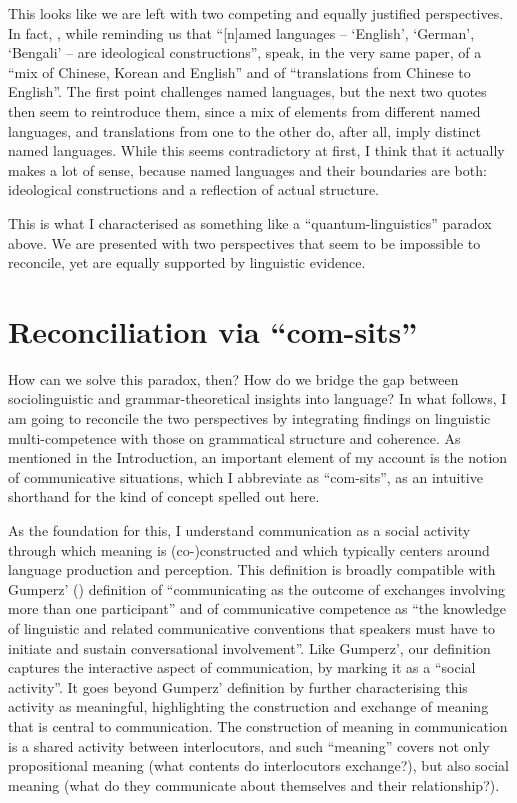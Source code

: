 This looks like we are left with two competing and equally justified perspectives. In fact, \citet{BlommaertRampton2011}, while reminding us that “[n]amed languages – ‘English’, ‘German’, ‘Bengali’ – are ideological constructions”, speak, in the very same paper, of a “mix of Chinese, Korean and English” and of “translations from Chinese to English”. The first point challenges named languages, but the next two quotes then seem to reintroduce them, since a mix of elements from different named languages, and translations from one to the other do, after all, imply distinct named languages. While this seems contradictory at first, I think that it actually makes a lot of sense, because named languages and their boundaries are both: ideological constructions and a reflection of actual structure.

This is what I characterised as something like a “quantum-linguistics” paradox above. We are presented with two perspectives that seem to be impossible to reconcile, yet are equally supported by linguistic evidence.

\section{Reconciliation via “com-sits”}
\label{sec:1.2}
How can we solve this paradox, then? How do we bridge the gap between sociolinguistic and grammar-theoretical insights into language? In what follows, I am going to reconcile the two perspectives by integrating findings on linguistic multi-competence with those on grammatical structure and coherence. As mentioned in the Introduction, an important element of my account is the notion of communicative situations, which I abbreviate as “com-sits”, as an intuitive shorthand for the kind of concept spelled out here.

As the foundation for this, I understand communication as a social activity through which meaning is (co-)constructed and which typically centers  around language production and perception. This definition is broadly compatible with Gumperz’ (\citeyear{Gumperz1981}) definition of “communicating as the outcome of exchanges involving more than one participant” and of communicative competence as “the knowledge of linguistic and related communicative conventions that speakers must have to initiate and sustain conversational involvement”. Like Gumperz’, our definition captures the interactive aspect of communication, by marking it as a “social activity”. It goes beyond Gumperz’ definition by further characterising this activity as meaningful, highlighting the construction and exchange of meaning that is central to communication. The construction of meaning in communication is a shared activity between interlocutors, and such “meaning” covers not only propositional meaning (what contents do interlocutors exchange?), but also social meaning (what do they communicate about themselves and their relationship?).

